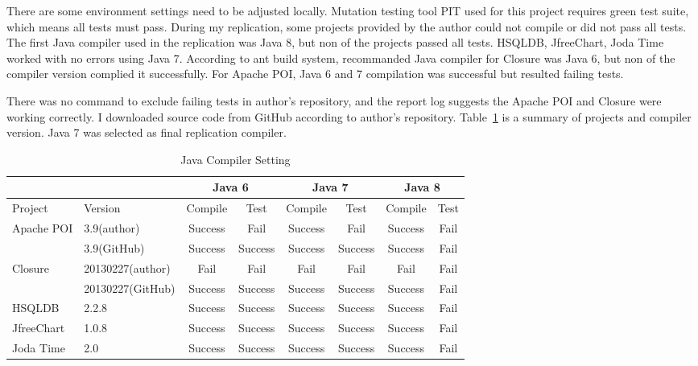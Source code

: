 There are some environment settings need to be adjusted locally. Mutation testing tool PIT used for this project requires green test suite, which means all tests must pass. During my replication, some projects provided by the author could not compile or did not pass all tests. The first Java compiler used in the replication was Java 8, but non of the projects passed all tests. HSQLDB, JfreeChart, Joda Time worked with no errors using Java 7. According to ant build system, recommanded Java compiler for Closure was Java 6, but non of the compiler version complied it successfully. For Apache POI, Java 6 and 7 compilation was successful but resulted failing tests.

There was no command to exclude failing tests in author's repository, and the report log suggests the Apache POI and Closure were working correctly. I downloaded source code from GitHub according to author's repository. Table~\ref{tab:sut} is a summary of projects and compiler version. Java 7 was selected as final replication compiler.


\begin{table}
	\caption{Java Compiler Setting}
	\label{tab:sut}
	\begin{minipage}{\columnwidth}
		\begin{center}
			\begin{tabular}{|l|l|c|c|c|c|c|c|}
				\hline
				&&\multicolumn{2}{|c|}{Java 6}&\multicolumn{2}{|c|}{Java 7}&\multicolumn{2}{|c|}{Java 8}\\
				\hline
				Project & Version & Compile & Test & Compile & Test & Compile & Test \\
				\hline
				Apache POI & 3.9(author) & Success & Fail & Success & Fail & Success & Fail \\
				& 3.9(GitHub) & Success & Success& Success& Success & Success& Fail \\
				\hline
				Closure& 20130227(author) & Fail & Fail & Fail & Fail & Fail & Fail \\
				&20130227(GitHub) & Success & Success & Success & Success & Success & Fail \\
				\hline
				HSQLDB & 2.2.8 & Success & Success & Success & Success & Success & Fail \\
				\hline
				JfreeChart & 1.0.8 & Success & Success & Success & Success & Success & Fail \\
				\hline
				Joda Time & 2.0 & Success & Success & Success & Success & Success & Fail \\
				\hline
			\end{tabular}
		\end{center}
		\bigskip
	\end{minipage}
\end{table}


